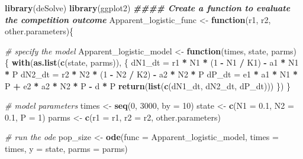 \documentclass[
]{book}
\newenvironment{Shaded}{\begin{snugshade}}{\end{snugshade}}
\newcommand{\AttributeTok}[1]{\textcolor[rgb]{0.13,0.29,0.53}{#1}}
\newcommand{\CommentTok}[1]{\textcolor[rgb]{0.56,0.35,0.01}{\textit{#1}}}
\newcommand{\ControlFlowTok}[1]{\textcolor[rgb]{0.13,0.29,0.53}{\textbf{#1}}}
\newcommand{\DecValTok}[1]{\textcolor[rgb]{0.00,0.00,0.81}{#1}}
\newcommand{\DocumentationTok}[1]{\textcolor[rgb]{0.56,0.35,0.01}{\textbf{\textit{#1}}}}
\newcommand{\FloatTok}[1]{\textcolor[rgb]{0.00,0.00,0.81}{#1}}
\newcommand{\FunctionTok}[1]{\textcolor[rgb]{0.13,0.29,0.53}{\textbf{#1}}}
\newcommand{\NormalTok}[1]{#1}
\newcommand{\OtherTok}[1]{\textcolor[rgb]{0.56,0.35,0.01}{#1}}
\newcommand{\SpecialCharTok}[1]{\textcolor[rgb]{0.81,0.36,0.00}{\textbf{#1}}}
\begin{document}
\begin{Shaded}
\begin{Highlighting}[]
\FunctionTok{library}\NormalTok{(deSolve)}
\FunctionTok{library}\NormalTok{(ggplot2)}
\DocumentationTok{\#\#\#\# Create a function to evaluate the competition outcome}
\NormalTok{Apparent\_logistic\_func }\OtherTok{\textless{}{-}} \ControlFlowTok{function}\NormalTok{(r1, r2, other.parameters)\{}

  \CommentTok{\# specify the model}
\NormalTok{  Apparent\_logistic\_model }\OtherTok{\textless{}{-}} \ControlFlowTok{function}\NormalTok{(times, state, parms) \{}
    \FunctionTok{with}\NormalTok{(}\FunctionTok{as.list}\NormalTok{(}\FunctionTok{c}\NormalTok{(state, parms)), \{}
\NormalTok{      dN1\_dt }\OtherTok{=}\NormalTok{ r1 }\SpecialCharTok{*}\NormalTok{ N1 }\SpecialCharTok{*}\NormalTok{ (}\DecValTok{1} \SpecialCharTok{{-}}\NormalTok{ N1 }\SpecialCharTok{/}\NormalTok{ K1) }\SpecialCharTok{{-}}\NormalTok{ a1 }\SpecialCharTok{*}\NormalTok{ N1 }\SpecialCharTok{*}\NormalTok{ P}
\NormalTok{      dN2\_dt }\OtherTok{=}\NormalTok{ r2 }\SpecialCharTok{*}\NormalTok{ N2 }\SpecialCharTok{*}\NormalTok{ (}\DecValTok{1} \SpecialCharTok{{-}}\NormalTok{ N2 }\SpecialCharTok{/}\NormalTok{ K2) }\SpecialCharTok{{-}}\NormalTok{ a2 }\SpecialCharTok{*}\NormalTok{ N2 }\SpecialCharTok{*}\NormalTok{ P}
\NormalTok{      dP\_dt }\OtherTok{=}\NormalTok{ e1 }\SpecialCharTok{*}\NormalTok{ a1 }\SpecialCharTok{*}\NormalTok{ N1 }\SpecialCharTok{*}\NormalTok{ P }\SpecialCharTok{+}\NormalTok{ e2 }\SpecialCharTok{*}\NormalTok{ a2 }\SpecialCharTok{*}\NormalTok{ N2 }\SpecialCharTok{*}\NormalTok{ P }\SpecialCharTok{{-}}\NormalTok{ d }\SpecialCharTok{*}\NormalTok{ P}
      \FunctionTok{return}\NormalTok{(}\FunctionTok{list}\NormalTok{(}\FunctionTok{c}\NormalTok{(dN1\_dt, dN2\_dt, dP\_dt)))}
\NormalTok{    \})}
\NormalTok{  \}}

  \CommentTok{\# model parameters}
\NormalTok{  times }\OtherTok{\textless{}{-}} \FunctionTok{seq}\NormalTok{(}\DecValTok{0}\NormalTok{, }\DecValTok{3000}\NormalTok{, }\AttributeTok{by =} \DecValTok{10}\NormalTok{)}
\NormalTok{  state }\OtherTok{\textless{}{-}} \FunctionTok{c}\NormalTok{(}\AttributeTok{N1 =} \FloatTok{0.1}\NormalTok{, }\AttributeTok{N2 =} \FloatTok{0.1}\NormalTok{, }\AttributeTok{P =} \DecValTok{1}\NormalTok{)}
\NormalTok{  parms }\OtherTok{\textless{}{-}} \FunctionTok{c}\NormalTok{(}\AttributeTok{r1 =}\NormalTok{ r1, }\AttributeTok{r2 =}\NormalTok{ r2, other.parameters)}

  \CommentTok{\# run the ode}
\NormalTok{  pop\_size }\OtherTok{\textless{}{-}} \FunctionTok{ode}\NormalTok{(}\AttributeTok{func =}\NormalTok{ Apparent\_logistic\_model, }\AttributeTok{times =}\NormalTok{ times, }\AttributeTok{y =}\NormalTok{ state, }\AttributeTok{parms =}\NormalTok{ parms)}


\end{Highlighting}
\end{Shaded}
\end{document}
